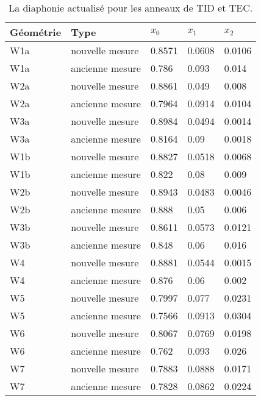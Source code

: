 \begin{table}[h]
\begin{center}
\begin{tabular}{|l|l|l|l|l|}
\hline
Géométrie  & Type & $x_{0}$ & $x_{1}$ & $x_{2}$ \\
\hline
\hline
W1a &  nouvelle mesure & 0.8571 & 0.0608 & 0.0106 \\
W1a &  ancienne mesure & 0.786 & 0.093 & 0.014 \\
\hline
W2a &  nouvelle mesure & 0.8861 & 0.049 & 0.008 \\
W2a &  ancienne mesure & 0.7964 & 0.0914 & 0.0104 \\
\hline
W3a &  nouvelle mesure & 0.8984 & 0.0494 & 0.0014 \\
W3a &  ancienne mesure & 0.8164 & 0.09 & 0.0018 \\
\hline
W1b &  nouvelle mesure & 0.8827 & 0.0518 & 0.0068 \\
W1b &  ancienne mesure & 0.822 & 0.08 & 0.009 \\
\hline
W2b &  nouvelle mesure & 0.8943 & 0.0483 & 0.0046 \\
W2b &  ancienne mesure & 0.888 & 0.05 & 0.006 \\
\hline
W3b &  nouvelle mesure & 0.8611 & 0.0573 & 0.0121 \\
W3b &  ancienne mesure & 0.848 & 0.06 & 0.016 \\
\hline
W4 &  nouvelle mesure & 0.8881 & 0.0544 & 0.0015 \\
W4 &  ancienne mesure & 0.876 & 0.06 & 0.002 \\
\hline
W5 &  nouvelle mesure & 0.7997 & 0.077 & 0.0231 \\
W5 &  ancienne mesure & 0.7566 & 0.0913 & 0.0304 \\
\hline
W6 &  nouvelle mesure & 0.8067 & 0.0769 & 0.0198 \\
W6 &  ancienne mesure & 0.762 & 0.093 & 0.026 \\
\hline
W7 &  nouvelle mesure & 0.7883 & 0.0888 & 0.0171 \\
W7 &  ancienne mesure & 0.7828 & 0.0862 & 0.0224 \\
\hline
\end{tabular}
\caption[Table caption text]{ La diaphonie actualisé pour les anneaux de TID et TEC. }
\label{tab:measuredXtalkTODTEC2}
\end{center}
\end{table}


